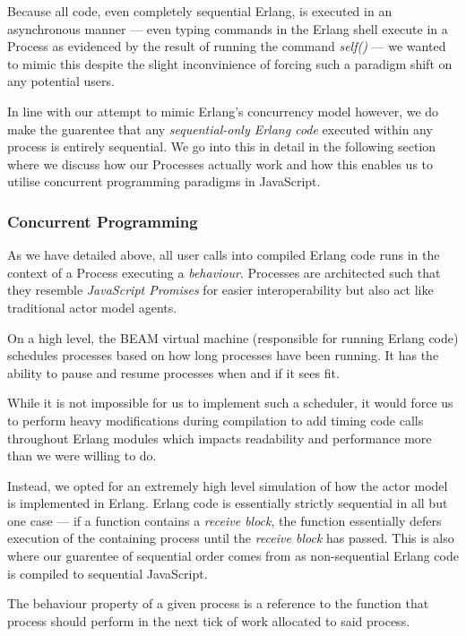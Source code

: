 \documentclass[twoside,12pt,titlepage,a4paper]{article}
\begin{document}
Because all code, even completely sequential Erlang, is executed in an asynchronous manner --- even typing commands in the Erlang shell execute in a Process as evidenced by the result of running the command \textit{self()} --- we wanted to mimic this despite the slight inconvinience of forcing such a paradigm shift on any potential users.

In line with our attempt to mimic Erlang's concurrency model however, we do make the guarentee that any \textit{sequential-only Erlang code} executed within any process is entirely sequential. We go into this in detail in the following section where we discuss how our Processes actually work and how this enables us to utilise concurrent programming paradigms in JavaScript. 

\subsubsection{Concurrent Programming} \label{sssec:num2}
As we have detailed above, all user calls into compiled Erlang code runs in the context of a Process executing a \textit{behaviour}. Processes are architected such that they resemble \textit{JavaScript Promises} for easier interoperability but also act like traditional actor model agents.

On a high level, the BEAM virtual machine (responsible for running Erlang code) schedules processes based on how long processes have been running. It has the ability to pause and resume processes when and if it sees fit. 

While it is not impossible for us to implement such a scheduler, it would force us to perform heavy modifications during compilation to add timing code calls throughout Erlang modules which impacts readability and performance more than we were willing to do.

Instead, we opted for an extremely high level simulation of how the actor model is implemented in Erlang. Erlang code is essentially strictly sequential in all but one case --- if a function contains a \textit{receive block}, the function essentially defers execution of the containing process until the \textit{receive block} has passed. This is also where our guarentee of sequential order comes from as non-sequential Erlang code is compiled to sequential JavaScript.

The behaviour property of a given process is a reference to the function that process should perform in the next tick of work allocated to said process. 
\end{document}
